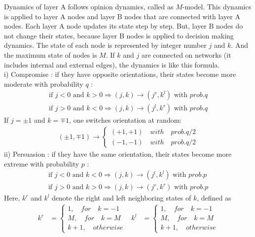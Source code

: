\documentclass[english]{cccconf}
\begin{document}
Dynamics of layer A follows opinion dynamics, called as $M$-model. This dynamics is applied to layer A nodes and layer B nodes that are connected with layer A nodes. Each layer A node updates its state step by step. But, layer B nodes do not change their states, because layer B nodes is applied to decision making dynamics. The state of each node is represented by integer number $j$ and $k$. And the maximum state of nodes is $M$. If $k$ and $j$ are connected on networks (it includes internal and external edges), the dynamics is like this formula\cite{gomez2015}. \\
i) Compromise : if they have opposite orientations, their states become more moderate with probability $q$ :
\begin{align*}
  \mbox{if } j<0 \mbox{ and } k>0  \Rightarrow (j, k) \rightarrow (j^r, k^l) \mbox{ with } prob.q\\
  \mbox{if } j>0 \mbox{ and } k<0  \Rightarrow (j, k) \rightarrow (j^l, k^r) \mbox{ with } prob.q
\end{align*}
If $j = \pm1$ and $k = \mp1$, one switches orientation at random:
\begin{align*}
(\pm 1, \mp 1)\rightarrow \left\{\begin{matrix}
(+1, +1) \quad with \quad prob.q/2
\\(-1, -1)\quad with \quad prob.q/2
\end{matrix}\right.
\end{align*}
ii) Persuasion : if they have the same orientation, their states become more extreme with probability $p$ :
\begin{align*}
  \mbox{if } j<0 \mbox{ and } k<0  \Rightarrow (j, k) \rightarrow (j^l, k^l) \mbox{ with } prob.p\\
  \mbox{if } j>0 \mbox{ and } k>0  \Rightarrow (j, k) \rightarrow (j^r, k^r) \mbox{ with } prob.p
\end{align*}
Here, $k^r$ and $k^l$ denote the right and left neighboring states of $k$, defined as
\begin{align*}
k^r &= \left\{\begin{matrix}
1,\quad for\quad k= -1
\\ M,\quad for \quad k=M
\\ k+1,\quad otherwise
\end{matrix}\right. &
k^l &= \left\{\begin{matrix}
1,\quad for\quad k= -1
\\ M,\quad for \quad k=M
\\ k+1,\quad otherwise
\end{matrix}\right.
\end{align*}
\end{document}
